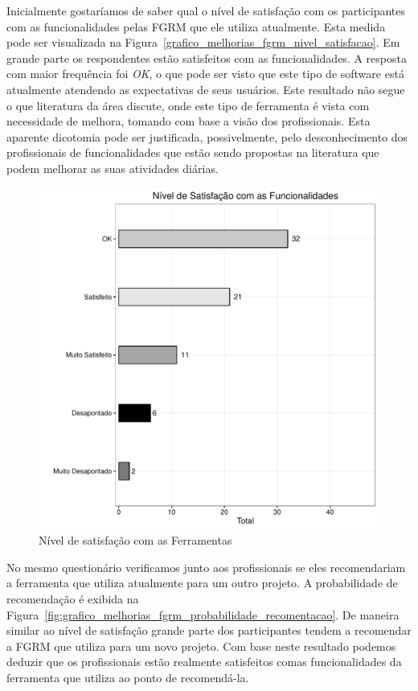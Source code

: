 Inicialmente gostaríamos de saber qual o nível de satisfação com os participantes
com as funcionalidades pelas FGRM que ele utiliza atualmente. Esta medida pode
ser visualizada na Figura~\ref{grafico_melhorias_fgrm_nivel_satisfacao}. Em
grande parte os respondentes estão satisfeitos com as funcionalidades. A
resposta com maior frequência foi \textit{OK}, o que pode ser visto que este
tipo de software está atualmente atendendo as expectativas de seus usuários.
Este resultado não segue o que literatura da área discute, onde este tipo de
ferramenta é vista com necessidade de melhora, tomando com base a visão dos
profissionais. Esta aparente dicotomia pode ser justificada, possivelmente, pelo
desconhecimento dos profissionais de funcionalidades que estão sendo propostas
na literatura que podem melhorar as suas atividades diárias.
\begin{figure}[htpb]
	\centering
	\includegraphics[width=0.8\linewidth]{./chapter-pesquisa-com-profissionais/img/grafico_melhorias_fgrm_nivel_satisfacao.pdf}
	\caption{Nível de satisfação com as Ferramentas}
\label{fig:grafico_melhorias_fgrm_nivel_satisfacao}
\end{figure}

No mesmo questionário verificamos junto aos profissionais se eles recomendariam
a ferramenta que utiliza atualmente para um outro projeto. A probabilidade de
recomendação é exibida na
Figura~\ref{fig:grafico_melhorias_fgrm_probabilidade_recomentacao}. De maneira
similar ao nível de satisfação grande parte dos participantes tendem a
recomendar a FGRM que utiliza para um novo projeto. Com base neste resultado
podemos deduzir que os profissionais estão realmente satisfeitos comas
funcionalidades da ferramenta que utiliza ao ponto de recomendá-la.

